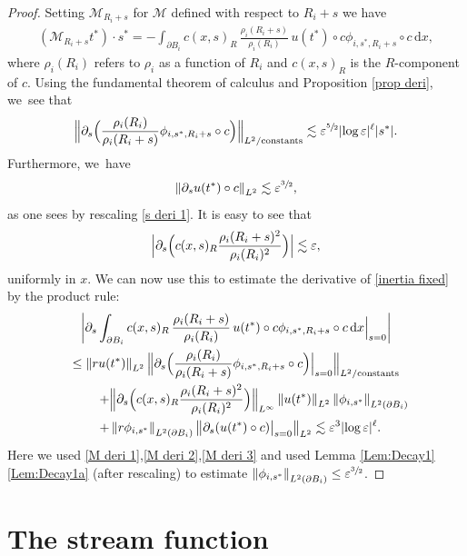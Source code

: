 \documentclass[JEP,XML,SOM,Unicode,published]{cedram}
\let\epsilon\varepsilon
\newcommand{\constants}{\textup{constants}}
\theoremstyle{definition}
\newcommand\norm[1]{\left\lVert #1\right\rVert}
\newcommand\Bnorm[1]{\Bigl\lVert #1\Bigr\rVert}
\newcommand\eq{=}
\newcommand\dd{\,\mathrm{d}}
\newcommand\dx{\dd x}
\let\de\partial
\let\eps\epsilon
\let\mel\relax
\begin{document}
\begin{proof}
Setting $\mathcal{M}_{R_i+s}$ for $\mathcal{M}$ defined with respect to $R_i+s$ we have
\begin{align}\label{inertia fixed}
(\mathcal{M}_{R_i+s}t^*)\cdot s^*\eq - \int_{\de B_i}c(x,s)_R\,\frac{\rho_i(R_i+s)}{\rho_i(R_i)}\,u(t^*)\circ c\phi_{i,s^*,R_i+s}\circ c\dx,
\end{align}
where $\rho_i(R_i)$ refers to $\rho_i$ as a function of $R_i$ and $c(x,s)_R$ is the $R$-component of $c$. Using the fundamental theorem of calculus and Proposition \ref{prop deri}, we~see that
\begin{equation}
\Bnorm{\de_s \Bigl(\frac{\rho_i(R_i)}{\rho_i(R_i+s)}\phi_{i,s^*,R_i+s}\circ c\Bigr)}_{L^2/\constants}\lesssim \eps^{\sfrac{5}{2}}|{\log\eps}|^\ell|s^*|.\label{M deri 2}
\end{equation}
Furthermore, we~have
\begin{align}
\norm{\de_su(t^*)\circ c}_{L^2}\lesssim \eps^{\sfrac{3}{2}},\label{M deri 1}
\end{align}
as one sees by rescaling \eqref{s deri 1}.
It is easy to see that
\begin{align}
\Bigl|\de_s\Bigl( c(x,s)_R\frac{\rho_i(R_i+s)^2}{\rho_i(R_i)^2}\Bigr)\Bigr|\lesssim \eps,\label{M deri 3}
\end{align}
uniformly in $x$.
We can now use this to estimate the derivative of \eqref{inertia fixed} by the product rule:
\begin{multline*}
\mel\left|\de_s \int_{\de B_i}c(x,s)_R\,\frac{\rho_i(R_i+s)}{\rho_i(R_i)}\,u(t^*)\circ c\phi_{i,s^*,R_i+s}\circ c\dx\Big|_{s=0}\right|\\
\leq \norm{ru(t^*)}_{L^2}\Bnorm{\de_s \Bigl(\frac{\rho_i(R_i)}{\rho_i(R_i+s)}\phi_{i,s^*,R_i+s}\circ c\Bigr)\Big|_{s=0}}_{L^2/\constants}\\
\hspace*{1cm}+\Bnorm{\de_s \Bigl(c(x,s)_R\frac{\rho_i(R_i+s)^2}{\rho_i(R_i)^2}\Bigr)}_{L^\infty}\norm{u(t^*)}_{L^2}\norm{\phi_{i,s^*}}_{L^2(\de B_i)}\\
\:\:\:+\norm{r\phi_{i,s^*}}_{L^2(\de B_i)}\norm{\de_s(u(t^*)\circ c)\big|_{s=0}}_{L^2}\lesssim \eps^3|{\log\eps}|^\ell.
\end{multline*}
Here we used \eqref{M deri 1},\eqref{M deri 2},\eqref{M deri 3} and used Lemma \ref{Lem:Decay1}\,\eqref{Lem:Decay1a} (after rescaling) to estimate $\norm{\phi_{i,s^*}}_{L^2(\de B_i)}\leq \eps^{\sfrac{3}{2}}$.
\end{proof}

\section{The stream function}\label{Section4}
\end{document}
